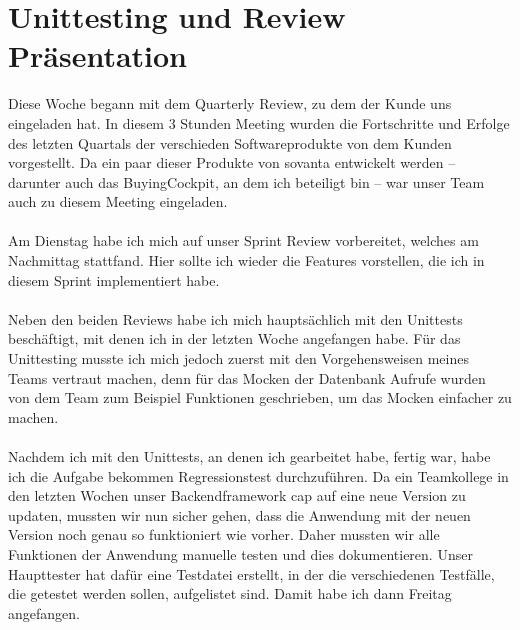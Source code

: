 \section{Unittesting und Review Präsentation}
Diese Woche begann mit dem Quarterly Review, zu dem der Kunde uns eingeladen hat. In diesem 3 Stunden Meeting wurden die Fortschritte und Erfolge des letzten Quartals der verschieden Softwareprodukte von dem Kunden vorgestellt. Da ein paar dieser Produkte von sovanta entwickelt werden – darunter auch das BuyingCockpit, an dem ich beteiligt bin – war unser Team auch zu diesem Meeting eingeladen. \\\\
Am Dienstag habe ich mich auf unser Sprint Review vorbereitet, welches am Nachmittag stattfand. Hier sollte ich wieder die Features vorstellen, die ich in diesem Sprint implementiert habe. \\\\
Neben den beiden Reviews habe ich mich hauptsächlich mit den Unittests beschäftigt, mit denen ich in der letzten Woche angefangen habe. Für das Unittesting musste ich mich jedoch zuerst mit den Vorgehensweisen meines Teams vertraut machen, denn für das Mocken der Datenbank Aufrufe wurden von dem Team zum Beispiel Funktionen geschrieben, um das Mocken einfacher zu machen. \\\\
Nachdem ich mit den Unittests, an denen ich gearbeitet habe, fertig war, habe ich die Aufgabe bekommen Regressionstest durchzuführen. Da ein Teamkollege in den letzten Wochen unser Backendframework \gls{cap} auf eine neue Version zu updaten, mussten wir nun sicher gehen, dass die Anwendung mit der neuen Version noch genau so funktioniert wie vorher. Daher mussten wir alle Funktionen der Anwendung manuelle testen und dies dokumentieren. Unser Haupttester hat dafür eine Testdatei erstellt, in der die verschiedenen Testfälle, die getestet werden sollen, aufgelistet sind. Damit habe ich dann Freitag angefangen. \\\\

